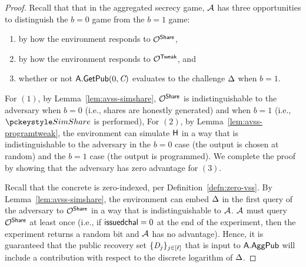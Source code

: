 \begin{proof}
  Recall that that in the aggregated secrecy game,
  $\mathcal{A}$ has three opportunities to distinguish the $b=0$ game from the $b=1$ game:
  \begin{enumerate}
    \item by how the environment responds to $\mathcal{O}^{\mathsf{Share}}$,
    \item by how the environment responds to $\mathcal{O}^{\mathsf{Tweak}}$, and
    \item whether or not
  $\mathsf{A}.\mathsf{GetPub}(0, \textit{C})$ evaluates to the challenge $\Delta$ when $b=1$.
  \end{enumerate}

  For $(1)$, by Lemma~\ref{lem:avss-simshare},
  $\mathcal{O}^{\mathsf{Share}}$ is indistinguishable to the adversary when $b=0$ (i.e., shares are honestly generated)
  and when $b=1$ (i.e., $\simshare$ is performed),
  For $(2)$, by Lemma~\ref{lem:avss-programtweak},
  the environment can simulate $\mathsf{H}$ in a way that is indistinguishable to the adversary
  in the $b=0$ case (the output is chosen at random) and the $b=1$ case (the output is programmed).
  We complete the proof by showing that the adversary has zero advantage for $(3)$.

  Recall that the concrete \AVSS is zero-indexed,
  per Definition~\ref{defn:zero-vss}.
  By Lemma~\ref{lem:avss-simshare}, the environment can embed $\Delta$ in the first query of the adversary to $\mathcal{O}^{\mathsf{Share}}$ in a way that is indistinguishable to $\mathcal{A}$.
  $\mathcal{A}$ must query $\mathcal{O}^{\mathsf{Share}}$ at least once
  (i.e., if $\mathsf{issuedchal}=0$ at the end of the experiment,
  then the experiment returns a random bit and $\mathcal{A}$ has no advantage).
  Hence,
  it is guaranteed that the public recovery set $\{ \textit{D}_j \}_{j \in [\mathsf{\ell}]}$
  that is input to $\mathsf{A}.\mathsf{AggPub}$
  will include a contribution with respect to the discrete logarithm of $\Delta$.


\end{proof}
